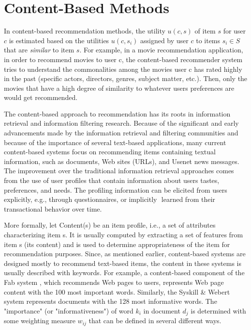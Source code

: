 \section{Content-Based Methods}
In content-based recommendation methods, the utility $u(c, s)$ of item $s$ for user $c$ is estimated based on the utilities $u(c ,s_i)$  assigned by user $c$ to items $s_i \in S$ that are \textit{similar} to item $s$. For example, in a movie recommendation application, in order to recommend movies to user c, the content-based recommender system tries to understand the commonalities among the movies user c has rated highly in the past (specific actors, directors, genres, subject matter, etc.). Then, only the movies that have a high degree of similarity to whatever users preferences are would get recommended.

The content-based approach to recommendation has its roots in information retrieval \citep{recom_7} \citep{recom_89} and information filtering \citep{recom_10} research. Because of the significant and early advancements made by the information retrieval and filtering communities and because of the importance of several text-based applications, many current content-based systems focus on recommending items containing textual information, such as documents, Web sites (URLs), and Usenet news messages. The improvement over the traditional information retrieval approaches comes from the use of user profiles that contain information about users tastes, preferences, and needs. The profiling information can be elicited from users explicitly, e.g., through questionnaires, or implicitly  learned from their transactional behavior over time.

More formally, let Content(s) be an item profile, i.e., a set of attributes characterizing item s. It is usually computed by extracting a set of features from item s (its content) and is used to determine appropriateness of the item for recommendation purposes. Since, as mentioned earlier, content-based systems are designed mostly to recommend text-based items, the content in these systems is usually described with keywords. For example, a content-based component of the Fab system \citep{recom_8}, which recommends Web pages to users, represents Web page content with the 100 most important words. Similarly, the Syskill \& Webert system \cite{recom_77} represents documents with the 128 most informative words. The "importance" (or "informativeness") of word $k_i$ in document $d_j$ is determined with some weighting measure $w_{ij}$ that can be defined in several different ways.

